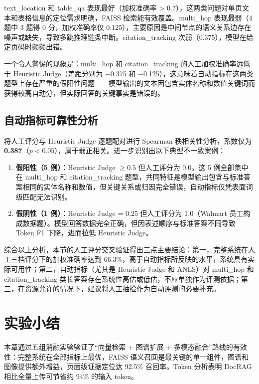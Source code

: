 text\_location 和 table\_qa 表现最好（加权准确率 > 0.7），这两类问题对单页文本和表格信息的定位需求明确，FAISS 检索能有效覆盖。multi\_hop 表现最弱（4 题中 3 题得 0 分，加权准确率仅 0.125），主要原因是中间节点的语义关系边存在噪声或缺失，导致多跳推理链条中断。citation\_tracking 次弱（0.375），模型在给定页码时频频出错。

一个令人警惕的现象是：multi\_hop 和 citation\_tracking 的人工加权准确率远低于 Heuristic Judge（差距分别为 $-$0.375 和 $-$0.125），这意味着自动指标在这两类题型上存在严重的假阳性问题——模型输出的文本因包含实体名称和数值关键词而获得较高自动分，但实际回答的关键事实是错误的。

\subsection{自动指标可靠性分析}

将人工评分与 Heuristic Judge 逐题配对进行 Spearman 秩相关性分析，系数仅为 \textbf{0.387}（$p < 0.05$），属于弱正相关。进一步识别出以下典型不一致案例：

\begin{enumerate}[label=（\arabic*）]
\item \textbf{假阳性（5 例）}：Heuristic Judge $\ge 0.5$ 但人工评分为 0.0。这 5 例全部集中在 multi\_hop 和 citation\_tracking 题型，共同特征是模型输出包含与标准答案相同的实体名称和数值，但关键关系或归因完全错误，自动指标仅凭表面词级匹配无法识别。
\item \textbf{假阴性（1 例）}：Heuristic Judge = 0.25 但人工评分为 1.0（Walmart 员工构成数据题）。模型回答数据完全正确，但因表述顺序与标准答案不同导致 Token F1 下降，进而拉低 Heuristic Judge。
\end{enumerate}

综合以上分析，本节的人工评分交叉验证得出三点主要结论：第一，完整系统在人工三档评分下的加权准确率达到 66.3\%，高于自动指标所反映的水平，系统具有实际可用性；第二，自动指标（尤其是 Heuristic Judge 和 ANLS）对 multi\_hop 和 citation\_tracking 类长答案存在系统性高估或低估，不应单独作为评测依据；第三，在资源允许的情况下，建议将人工抽检作为自动评测的必要补充。

\section{实验小结}\label{sec:exp-summary}

本章通过五组消融实验验证了``向量检索 + 图谱扩展 + 多模态融合''路线的有效性：完整系统在全部指标上最优，FAISS 语义召回是最关键的单一组件，图谱和图像提供额外增益，页面级证据定位达 92.5\% 召回率。Token 分析表明 DocRAG 相比全量上传可节省约 94\% 的输入 token。
